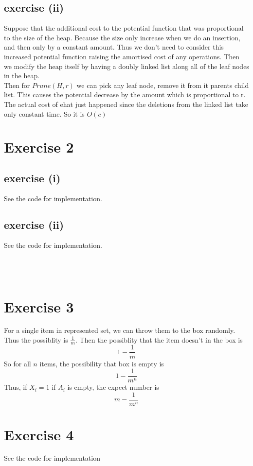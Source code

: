 \documentclass[12pt,oneside,a4paper]{article}
\begin{document}
\subsection{exercise (ii)}
Suppose that the additional cost to the potential function that was proportional to the size of the heap. Because the size only increase
when we do an insertion, and then only by a constant amount. Thus we don't need to consider this increased potential function raising
the amortised cost of any operations. Then we modify the heap itself  by having a doubly linked list along all of the leaf nodes in the heap.\\
Then for $Prune(H,r)$ we can pick any leaf node, remove it from it parents child list. This causes the potential decrease by the amount which 
is proportional to r. The actual cost of ehat just happened since the deletions from the linked list take only constant time.
So it is $O(c)$
\section{Exercise 2}
\subsection{exercise (i)}
See the code for implementation.
\subsection{exercise (ii)}
See the code for implementation.\\
~\\
~\\
~\\ 
\section{Exercise 3}

For a single item in represented set, we can throw them to the box randomly. Thus the possiblity is $\frac{1}{m}$. Then the possiblity that 
the item doesn't in the box is 
$$
1-\frac{1}{m}
$$
So for all $n$ items, the possibility that box is empty is 
$$
1-\frac{1}{m^n}
$$
Thus, if $X_i=1$ if $A_i$ is empty, the expect number is 
$$
m-\frac{1}{m^n}
$$ 
\section{Exercise 4}
See the code for implementation
\end{document}
